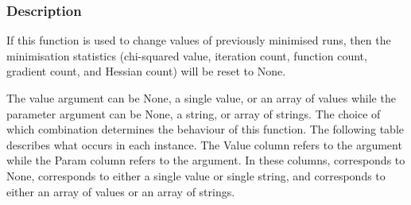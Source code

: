   
 \subsubsection{Description} 

 If this function is used to change values of previously minimised runs, then the minimisation statistics (chi-squared value, iteration count, function count, gradient count, and Hessian count) will be reset to None. 
  

 The value argument can be None, a single value, or an array of values while the parameter argument can be None, a string, or array of strings.  The choice of which combination determines the behaviour of this function.  The following table describes what occurs in each instance.  The Value column refers to the  argument while the Param column refers to the  argument.  In these columns,  corresponds to None,  corresponds to either a single value or single string, and  corresponds to either an array of values or an array of strings. 
  

